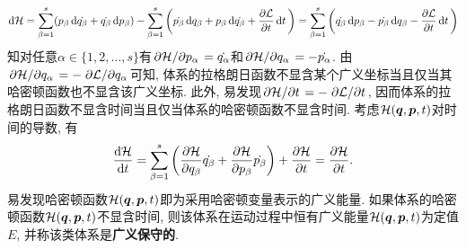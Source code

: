 \begin{equation*}
    \dd{\mathcal{H}} = \sum_{\beta=1}^s (p_{\beta} \dd{\dot{q_{\beta}}} + \dot{q_{\beta}} \dd{p_{\beta}}) - \sum_{\beta=1}^s \bigg(\dot{p_{\beta}} \dd{q_{\beta}} + p_{\beta} \dd{\dot{q_{\beta}}} + \pdv{\mathcal{L}}{t}\dd{t}\bigg) = \sum_{\beta=1}^s \bigg(\dot{q_{\beta}} \dd{p_{\beta}} - \dot{p_{\beta}} \dd{q_{\beta}} - \pdv{\mathcal{L}}{t}\dd{t}\bigg)
\end{equation*}
知对任意$ \alpha \in \{1,2,\ldots,s\} $有$ \pdv*{\mathcal{H}}{p_{\alpha}} = \dot{q_{\alpha}} $和$ \pdv*{\mathcal{H}}{q_{\alpha}} = -\dot{p_{\alpha}} $. 由$ \pdv*{\mathcal{H}}{q_{\alpha}} = -\pdv*{\mathcal{L}}{q_{\alpha}} $可知, 体系的拉格朗日函数不显含某个广义坐标当且仅当其哈密顿函数也不显含该广义坐标. 此外, 易发现$ \pdv*{\mathcal{H}}{t} = -\pdv*{\mathcal{L}}{t} $, 因而体系的拉格朗日函数不显含时间当且仅当体系的哈密顿函数不显含时间. 考虑$ \mathcal{H}(\vb*{q},\vb*{p},t) $对时间的导数, 有
\begin{equation*}
    \dv{\mathcal{H}}{t} = \sum_{\beta =1}^s \bigg(\pdv{\mathcal{H}}{q_{\beta}}\dot{q_{\beta}} + \pdv{\mathcal{H}}{p_{\beta}}\dot{p_{\beta}}\bigg) + \pdv{\mathcal{H}}{t} = \pdv{\mathcal{H}}{t}.
\end{equation*}
易发现哈密顿函数$ \mathcal{H}(\vb*{q},\vb*{p},t) $即为采用哈密顿变量表示的广义能量. 如果体系的哈密顿函数$ \mathcal{H}(\vb*{q},\vb*{p},t) $不显含时间, 则该体系在运动过程中恒有广义能量$ \mathcal{H}(\vb*{q},\vb*{p},t) $为定值$ E $, 并称该类体系是\textbf{广义保守的}.

